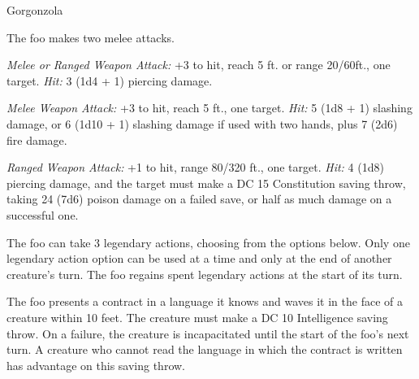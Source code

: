 \documentclass[letterpaper,twocolumn,openany]{memoir}
\begin{document}
\begin{RPGStatBlock}[float*=b,width=\textwidth + 8pt]{Gorgonzola}
\begin{multicols}{2}
		\columnbreak

		The foo makes two melee attacks.

		\textit{Melee or Ranged Weapon Attack:} +3 to hit, reach 5 ft. or range 20/60ft.,
		one target. \textit{Hit:} 3 (1d4 + 1) piercing damage.

		\textit{Melee Weapon Attack:} +3 to hit, reach 5 ft., one target. \textit{Hit:}
		5 (1d8 + 1) slashing damage, or 6 (1d10 + 1) slashing damage if used with two hands,
		plus 7 (2d6) fire damage.

		\textit{Ranged Weapon Attack:} +1 to hit, range 80/320 ft., one target.
		\textit{Hit:} 4 (1d8) piercing damage, and the target must make a DC 15 Constitution saving throw,
		taking 24 (7d6) poison damage on a failed save, or half as much damage on a successful one.

    	The foo can take 3 legendary actions, choosing from the options below.
		Only one legendary action option can be used at a time and only at the end of
		another creature's turn. The foo regains spent legendary actions at the start
		of its turn.

		\begin{RPGMonsterLegendaryActions}
			{The foo presents a contract in a language it knows and waves it in the face
			of a creature within 10 feet. The creature must make a DC 10 Intelligence
			saving throw. On a failure, the creature is incapacitated until the start of
			the foo's next turn. A creature who cannot read the language in which the
			contract is written has advantage on this saving throw.}
		\end{RPGMonsterLegendaryActions}
	\end{multicols}
\end{RPGStatBlock}
\end{document}
